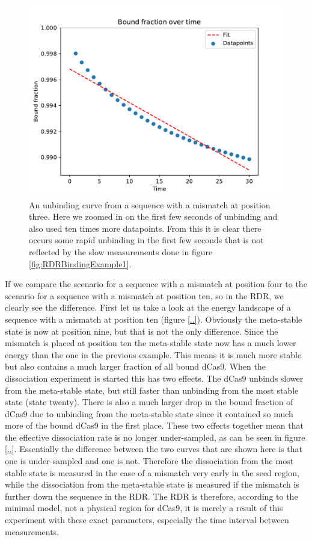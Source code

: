 \begin{figure}
\begin{center}
\includegraphics[width=\textwidth]{images/RDRBindingExample2}
\caption{An unbinding curve from a sequence with a mismatch at position three. Here we zoomed in on the first few seconds of unbinding and also used ten times more datapoints. From this it is clear there occurs some rapid unbinding in the first few seconds that is not reflected by the slow measurements done in figure \ref{fig:RDRBindingExample1}.}
\label{fig:RDRBindingExample2}
\end{center}
\end{figure}


If we compare the scenario for a sequence with a mismatch at position four to the scenario for a sequence with a mismatch at position ten, so in the RDR, we clearly see the difference. First let us take a look at the energy landscape of a sequence with a mismatch at position ten (figure \ref{..}). Obviously the meta-stable state is now at position nine, but that is not the only difference. Since the mismatch is placed at position ten the meta-stable state now has a much lower energy than the one in the previous example. This means it is much more stable but also contains a much larger fraction of all bound dCas9. When the dissociation experiment is started this has two effects. The dCas9 unbinds slower from the meta-stable state, but still faster than unbinding from the most stable state (state twenty). There is also a much larger drop in the bound fraction of dCas9 due to unbinding from the meta-stable state since it contained so much more of the bound dCas9 in the first place. These two effects together mean that the effective dissociation rate is no longer under-sampled, as can be seen in figure \ref{..}. Essentially the difference between the two curves that are shown here is that one is under-sampled and one is not. Therefore the dissociation from the most stable state is measured in the case of a mismatch very early in the seed region, while the dissociation from the meta-stable state is measured if the mismatch is further down the sequence in the RDR. The RDR is therefore, according to the minimal model, not a physical region for dCas9, it is merely a result of this experiment with these exact parameters, especially the time interval between measurements.

